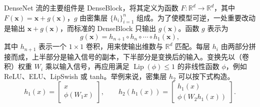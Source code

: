 DenseNet 流的主要组件是 DenseBlock，将其定义为函数 $F\colon\mathbb{R}^d\to\mathbb{R}^d$，其中 $F(\mathbf{x})=\mathbf{x}+g(\mathbf{x})$，$g$ 由密集层 $\{h_i\}_{i=1}^n$ 组成。为了使模型可逆，一处重要改动是输出 $\mathbf{x}+g(\mathbf{x})$，而标准的 DenseBlock 只输出 $g(\mathbf{x})$。函数 $g$ 表示为
\begin{equation}
g(\mathbf{x})=h_{n+1}\circ h_n\circ\cdots\circ h_1(\mathbf{x}),
\tag{4.25}\label{eq:04-25}
\end{equation}
其中 $h_{n+1}$ 表示一个 $1\times1$ 卷积，用来使输出维数与 $\mathbb{R}^d$ 匹配。每层 $h_i$ 由两部分拼接而成，上半部分是输入信号的副本，下半部分是变换后的输入。变换先以（卷积）权重 $W_i$ 乘以输入信号，再应用满足 $\operatorname{Lip}(\phi)\le 1$ 的非线性函数 $\phi$，例如 ReLU、ELU、LipSwish 或 tanh。举例来说，密集层 $h_2$ 可以按下式构造。
\begin{equation}
h_1(x)=\begin{bmatrix}x\\\phi(W_1x)\end{bmatrix},
\qquad
h_2(h_1(x))=\begin{bmatrix}h_1(x)\\\phi(W_2h_1(x))\end{bmatrix}.
\tag{4.26}\label{eq:04-26}
\end{equation}

